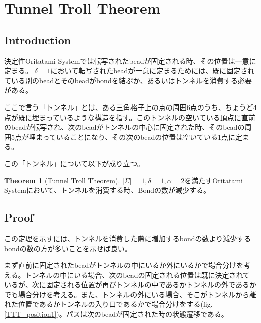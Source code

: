 \documentclass[a4,dvipdfmx,11pt]{article}
\theoremstyle{definition}
\newtheorem{myth}{Theorem}[section]
\begin{document}
\section{Tunnel Troll Theorem}
\subsection{Introduction}
決定性Oritatami Systemでは転写されたbeadが固定される時、その位置は一意に定まる。
$\delta = 1$において転写されたbeadが一意に定まるためには、既に固定されている別のbeadとそのbeadがbondを結ぶか、あるいはトンネルを消費する必要がある。

ここで言う「トンネル」とは、ある三角格子上の点の周囲6点のうち、ちょうど4点が既に埋まっているような構造を指す。このトンネルの空いている頂点に直前のbeadが転写され、次のbeadがトンネルの中心に固定された時、そのbeadの周囲5点が埋まっていることになり、その次のbeadの位置は空いている1点に定まる。


この「トンネル」について以下が成り立つ。

\begin{myth}[Tunnel Troll Theorem]
  $|\Sigma| = 1, \delta = 1, \alpha = 2$を満たすOritatami Systemにおいて、トンネルを消費する時、Bondの数が減少する。
\end{myth}

\subsection{Proof}

この定理を示すには、トンネルを消費した際に増加するbondの数より減少するbondの数の方が多いことを示せば良い。


まず直前に固定されたbeadがトンネルの中にいるか外にいるかで場合分けを考える。トンネルの中にいる場合、次のbeadの固定される位置は既に決定されているが、次に固定される位置が再びトンネルの中であるかトンネルの外であるかでも場合分けを考える。また、トンネルの外にいる場合、そこがトンネルから離れた位置であるかトンネルの入り口であるかで場合分けをする(fig.\ref{TTT_position1})。パスは次のbeadが固定された時の状態遷移である。
\end{document}
